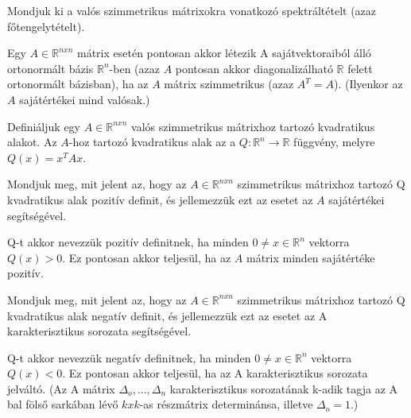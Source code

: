 \begin{frame}
  \begin{tcolorbox}[title={44}]
    Mondjuk ki a valós szimmetrikus mátrixokra vonatkozó spektráltételt (azaz főtengelytételt).

  \tcblower
Egy $A \in \mathbb{R}^{n x n}$ mátrix esetén pontosan akkor létezik A sajátvektoraiból álló ortonormált bázis $\mathbb{R}^n$-ben (azaz $A$ pontosan akkor diagonalizálható $\mathbb{R}$ felett ortonormált bázisban), ha az $A$ mátrix szimmetrikus (azaz $A^T = A$). (Ilyenkor az $A$ sajátértékei mind valósak.)

  \end{tcolorbox}
\end{frame}


\begin{frame}
  \begin{tcolorbox}[title={45}]
    Definiáljuk egy $A \in \mathbb{R}^{n x n}$ valós szimmetrikus mátrixhoz tartozó kvadratikus alakot.
  \tcblower
Az $A$-hoz tartozó kvadratikus alak az a $Q : \mathbb{R}^n {\rightarrow} \mathbb{R}$ függvény, melyre $Q(x) = x^TAx$.
  \end{tcolorbox}
\end{frame}

\begin{frame}
  \begin{tcolorbox}[title={46}]
     Mondjuk meg, mit jelent az, hogy az $A \in \mathbb{R}^{n x n}$ szimmetrikus mátrixhoz tartozó Q kvadratikus alak pozitív definit, és jellemezzük ezt az esetet az $A$ sajátértékei segítségével.

  \tcblower
Q-t akkor nevezzük pozitív definitnek, ha minden $0 \neq x \in \mathbb{R}^n$ vektorra $Q(x) > 0$. Ez pontosan akkor teljesül, ha az $A$ mátrix minden sajátértéke pozitív.
  \end{tcolorbox}
\end{frame}


\begin{frame}
  \begin{tcolorbox}[title={46}]
     Mondjuk meg, mit jelent az, hogy az $A \in \mathbb{R}^{n x n}$ szimmetrikus mátrixhoz tartozó Q kvadratikus alak negatív definit, és jellemezzük ezt az esetet az A karakterisztikus sorozata segítségével.

  \tcblower
Q-t akkor nevezzük negatív definitnek, ha minden $0 \neq x \in \mathbb{R}^n$ vektorra $Q(x) < 0$. Ez pontosan akkor teljesül, ha az A karakterisztikus sorozata jelváltó. (Az A mátrix ${\Delta}_o,...,{\Delta}_n$ karakterisztikus sorozatának k-adik tagja az A bal fölső sarkában lévő $k x k$-as részmátrix determinánsa, illetve ${\Delta}_o = 1$.)

  \end{tcolorbox}
\end{frame}




